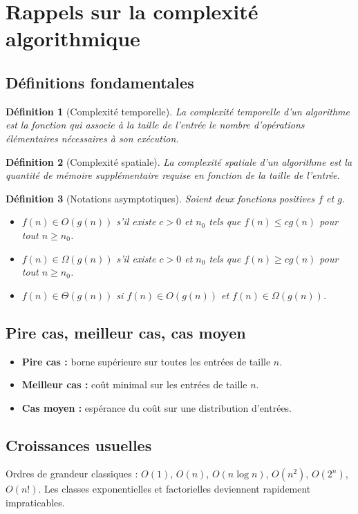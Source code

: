 \documentclass[12pt,a4paper]{article}
\newtheorem{definition}{Définition}[section]
\begin{document}
\section{Rappels sur la complexité algorithmique}

\subsection{Définitions fondamentales}
\begin{definition}[Complexité temporelle]
La complexité temporelle d'un algorithme est la fonction qui associe à la taille de l'entrée le nombre d'opérations élémentaires nécessaires à son exécution.
\end{definition}

\begin{definition}[Complexité spatiale]
La complexité spatiale d'un algorithme est la quantité de mémoire supplémentaire requise en fonction de la taille de l'entrée.
\end{definition}

\begin{definition}[Notations asymptotiques]
Soient deux fonctions positives $f$ et $g$.
\begin{itemize}
  \item $f(n) \in O(g(n))$ s'il existe $c>0$ et $n_0$ tels que $f(n) \le c g(n)$ pour tout $n\ge n_0$.
  \item $f(n) \in \Omega(g(n))$ s'il existe $c>0$ et $n_0$ tels que $f(n) \ge c g(n)$ pour tout $n\ge n_0$.
  \item $f(n) \in \Theta(g(n))$ si $f(n) \in O(g(n))$ et $f(n) \in \Omega(g(n))$.
\end{itemize}
\end{definition}

\subsection{Pire cas, meilleur cas, cas moyen}
\begin{itemize}
  \item \textbf{Pire cas :} borne supérieure sur toutes les entrées de taille $n$.
  \item \textbf{Meilleur cas :} coût minimal sur les entrées de taille $n$.
  \item \textbf{Cas moyen :} espérance du coût sur une distribution d'entrées.
\end{itemize}

\subsection{Croissances usuelles}
Ordres de grandeur classiques : $O(1)$, $O(n)$, $O(n\log n)$, $O(n^2)$, $O(2^n)$, $O(n!)$. Les classes exponentielles et factorielles deviennent rapidement impraticables.
\end{document}
